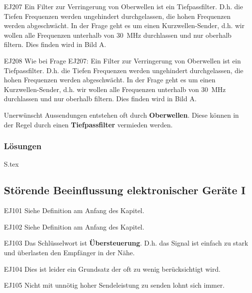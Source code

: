 \documentclass[10pt,a4paper,ngerman]{article}
\theoremstyle{definition}
\theoremstyle{plain}
\theoremstyle{mytheorem}
\theoremstyle{definition}
\newenvironment{ohmchapter}{}
{
  \subsubsection*{Lösungen}
  S\arabic{subsection}.tex}
}
\begin{document}
\begin{sol}{EJ207}
Ein Filter zur Verringerung von Oberwellen ist ein Tiefpassfilter. D.h. die Tiefen Frequenzen werden ungehindert durchgelassen, die hohen Frequenzen werden abgeschwächt.
In der Frage geht es um einen Kurzwellen-Sender, d.h. wir wollen alle Frequenzen unterhalb von \SI{30}{\mega\hertz} durchlassen und nur oberhalb filtern. Dies finden wird in Bild A.
\end{sol}  


\begin{sol}{EJ208}
Wie bei Frage EJ207: Ein Filter zur Verringerung von Oberwellen ist ein Tiefpassfilter. D.h. die Tiefen Frequenzen werden ungehindert durchgelassen, die hohen Frequenzen werden abgeschwächt.
In der Frage geht es um einen Kurzwellen-Sender, d.h. wir wollen alle Frequenzen unterhalb von \SI{30}{\mega\hertz} durchlassen und nur oberhalb filtern. Dies finden wird in Bild A.
\end{sol}  

\begin{ohmchapter}
  Unerwünscht Aussendungen entstehen oft durch \textbf{Oberwellen}. Diese können in der Regel durch einen \textbf{Tiefpassfilter} vermieden werden.
\end{ohmchapter}


\subsection{Störende Beeinflussung elektronischer Geräte I}


\begin{sol}{EJ101}
Siehe Definition am Anfang des Kapitel.
\end{sol}  

\begin{sol}{EJ102}
Siehe Definition am Anfang des Kapitel.
\end{sol}  


\begin{sol}{EJ103}
Das Schlüsselwort ist \textbf{Übersteuerung}. D.h. das Signal ist einfach zu stark und überlasten den Empfänger in der Nähe.
\end{sol}


\begin{sol}{EJ104}
Dies ist leider ein Grundsatz der oft zu wenig berücksichtigt wird. 
\end{sol}

\begin{sol}{EJ105}
Nicht mit unnötig hoher Sendeleistung zu senden lohnt sich immer.
\end{sol}
\end{document}
